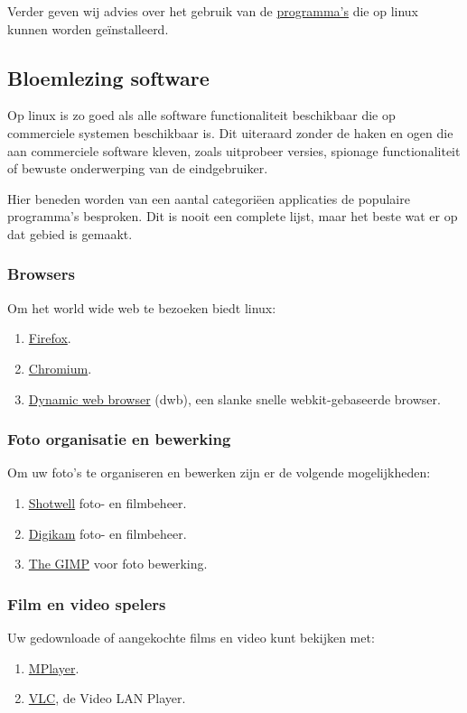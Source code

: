 Verder geven wij advies over het gebruik van de \href{https://packages.debian.org/stable/}{programma's} die op linux kunnen worden ge\"{i}nstalleerd.

\subsection{Bloemlezing software}
Op linux is zo goed als alle software functionaliteit beschikbaar die op commerciele systemen beschikbaar is. Dit uiteraard zonder de haken en ogen die aan commerciele software kleven, zoals uitprobeer versies, spionage functionaliteit of bewuste onderwerping van de eindgebruiker. 

Hier beneden worden van een aantal categori\"{e}en applicaties de populaire programma's besproken. Dit is nooit een complete lijst, maar het beste wat er op dat gebied is gemaakt.

\subsubsection{Browsers}
Om het world wide web te bezoeken biedt linux:

\begin{enumerate}
	\item \href{https://www.mozilla.org/nl/firefox/new/}{Firefox}.
	\item \href{http://www.chromium.org/}{Chromium}.
	\item \href{http://portix.bitbucket.org/dwb/}{Dynamic web browser} (dwb), een slanke snelle webkit-gebaseerde browser.
\end{enumerate}

\subsubsection{Foto organisatie en bewerking}
Om uw foto's te organiseren en bewerken zijn er de volgende mogelijkheden:

\begin{enumerate}
	\item \href{https://wiki.gnome.org/Apps/Shotwell}{Shotwell} foto- en filmbeheer.
	\item \href{https://www.digikam.org/}{Digikam}  foto- en filmbeheer.
	\item \href{http://www.gimp.org/}{The GIMP} voor foto bewerking.
\end{enumerate}

\subsubsection{Film en video spelers}
Uw gedownloade of aangekochte films en video kunt bekijken met:
\begin{enumerate}
	\item \href{http://www.mplayer.org/}{MPlayer}.
	\item \href{http://www.videolan.org/vlc/}{VLC}, de Video LAN Player.
\end{enumerate}

